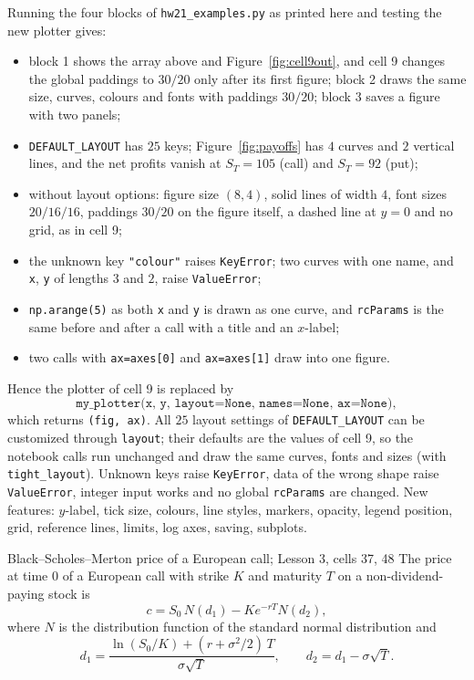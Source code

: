 \documentclass[11pt,a4paper]{article}
\newcommand{\ansbox}[1]{\begin{ansboxenv}#1\end{ansboxenv}}
\newcommand{\subhead}[1]{\par\medskip\noindent{\large\bfseries #1}\par\smallskip\noindent\ignorespaces}
\begin{document}
\subhead{Check.} Running the four blocks of \texttt{hw21\_examples.py} as printed here and testing the new plotter gives:
\begin{itemize}
\item block 1 shows the array above and Figure~\ref{fig:cell9out}, and cell 9 changes the global paddings to $30/20$ only after its first figure; block 2 draws the same size, curves, colours and fonts with paddings $30/20$; block 3 saves a figure with two panels;
\item \texttt{DEFAULT\_LAYOUT} has $25$ keys; Figure~\ref{fig:payoffs} has $4$ curves and $2$ vertical lines, and the net profits vanish at $S_T=105$ (call) and $S_T=92$ (put);
\item without layout options: figure size $(8,4)$, solid lines of width $4$, font sizes $20/16/16$, paddings $30/20$ on the figure itself, a dashed line at $y=0$ and no grid, as in cell 9;
\item the unknown key \texttt{"colour"} raises \texttt{KeyError}; two curves with one name, and \texttt{x}, \texttt{y} of lengths $3$ and $2$, raise \texttt{ValueError};
\item \texttt{np.arange(5)} as both \texttt{x} and \texttt{y} is drawn as one curve, and \texttt{rcParams} is the same before and after a call with a title and an $x$-label;
\item two calls with \texttt{ax=axes[0]} and \texttt{ax=axes[1]} draw into one figure.
\end{itemize}

\ansbox{Hence the plotter of cell 9 is replaced by
\[
\texttt{my\_plotter(x, y, layout=None, names=None, ax=None)},
\]
which returns \texttt{(fig, ax)}. All $25$ layout settings of \texttt{DEFAULT\_LAYOUT} can be customized through \texttt{layout}; their defaults are the values of cell 9, so the notebook calls run unchanged and draw the same curves, fonts and sizes (with \texttt{tight\_layout}). Unknown keys raise \texttt{KeyError}, data of the wrong shape raise \texttt{ValueError}, integer input works and no global \texttt{rcParams} are changed. New features: $y$-label, tick size, colours, line styles, markers, opacity, legend position, grid, reference lines, limits, log axes, saving, subplots.}

\bigskip
\begin{thmbox}{Black--Scholes--Merton price of a European call; Lesson 3, cells 37, 48}
The price at time $0$ of a European call with strike $K$ and maturity $T$ on a non-dividend-paying stock is
\begin{equation}\label{eq:call}
c=S_0\,N(d_1)-K e^{-rT}N(d_2),
\end{equation}
where $N$ is the distribution function of the standard normal distribution and
\begin{equation}\label{eq:d1d2}
d_1=\frac{\ln(S_0/K)+(r+\sigma^2/2)\,T}{\sigma\sqrt{T}},\qquad d_2=d_1-\sigma\sqrt{T}.
\end{equation}
\end{thmbox}
\end{document}
